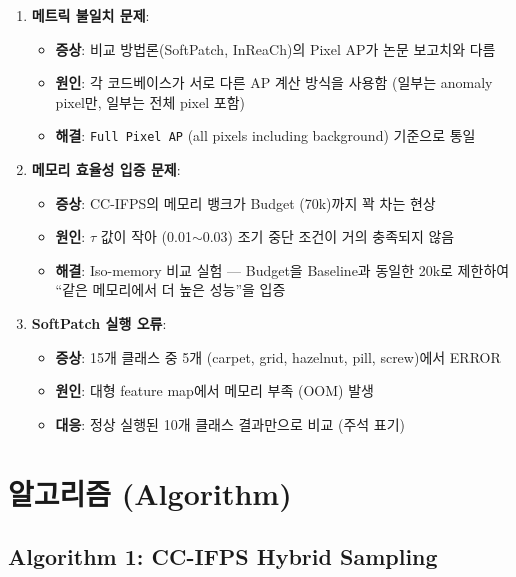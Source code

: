 \documentclass[11pt,a4paper]{article}
\begin{document}
\begin{enumerate}[leftmargin=2em]
  \item \textbf{메트릭 불일치 문제}:
  \begin{itemize}
    \item \textbf{증상}: 비교 방법론(SoftPatch, InReaCh)의 Pixel AP가 논문 보고치와 다름
    \item \textbf{원인}: 각 코드베이스가 서로 다른 AP 계산 방식을 사용함 (일부는 anomaly pixel만, 일부는 전체 pixel 포함)
    \item \textbf{해결}: \texttt{Full Pixel AP} (all pixels including background) 기준으로 통일
  \end{itemize}
  
  \item \textbf{메모리 효율성 입증 문제}:
  \begin{itemize}
    \item \textbf{증상}: CC-IFPS의 메모리 뱅크가 Budget (70k)까지 꽉 차는 현상
    \item \textbf{원인}: $\tau$ 값이 작아 (0.01$\sim$0.03) 조기 중단 조건이 거의 충족되지 않음
    \item \textbf{해결}: Iso-memory 비교 실험 — Budget을 Baseline과 동일한 20k로 제한하여 ``같은 메모리에서 더 높은 성능''을 입증
  \end{itemize}
  
  \item \textbf{SoftPatch 실행 오류}:
  \begin{itemize}
    \item \textbf{증상}: 15개 클래스 중 5개 (carpet, grid, hazelnut, pill, screw)에서 ERROR
    \item \textbf{원인}: 대형 feature map에서 메모리 부족 (OOM) 발생
    \item \textbf{대응}: 정상 실행된 10개 클래스 결과만으로 비교 (주석 표기)
  \end{itemize}
\end{enumerate}


\section{알고리즘 (Algorithm)}

\subsection{Algorithm 1: CC-IFPS Hybrid Sampling}
\end{document}
